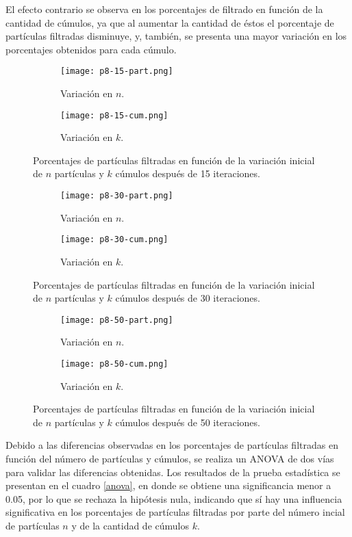 \documentclass{article}
\begin{document}
El efecto contrario se observa en los porcentajes de filtrado en función de la cantidad de cúmulos, ya que al aumentar la cantidad de éstos el porcentaje de partículas filtradas disminuye, y, también, se presenta una mayor variación en los porcentajes obtenidos para cada cúmulo.

\begin{figure}
\centering
\begin{subfigure}[b]{0.49\linewidth}
\texttt{[image: p8-15-part.png]}
\caption{Variación en $n$.}
\label{1}
\end{subfigure}
\begin{subfigure}[b]{0.49\linewidth}
\texttt{[image: p8-15-cum.png]}
\caption{Variación en $k$.}
\label{2}
\end{subfigure}
\caption{Porcentajes de partículas filtradas en función de la variación inicial de $n$ partículas y $k$ cúmulos después de 15 iteraciones.}
\label{15}
\end{figure}

\begin{figure}
\centering
\begin{subfigure}[b]{0.49\linewidth}
\texttt{[image: p8-30-part.png]}
\caption{Variación en $n$.}
\label{3}
\end{subfigure}
\begin{subfigure}[b]{0.49\linewidth}
\texttt{[image: p8-30-cum.png]}
\caption{Variación en $k$.}
\label{4}
\end{subfigure}
\caption{Porcentajes de partículas filtradas en función de la variación inicial de $n$ partículas y $k$ cúmulos después de 30 iteraciones.}
\label{30}
\end{figure}

\begin{figure}
\centering
\begin{subfigure}[b]{0.49\linewidth}
\texttt{[image: p8-50-part.png]}
\caption{Variación en $n$.}
\label{5}
\end{subfigure}
\begin{subfigure}[b]{0.49\linewidth}
\texttt{[image: p8-50-cum.png]}
\caption{Variación en $k$.}
\label{6}
\end{subfigure}
\caption{Porcentajes de partículas filtradas en función de la variación inicial de $n$ partículas y $k$ cúmulos después de 50 iteraciones.}
\label{50}
\end{figure}

Debido a las diferencias observadas en los porcentajes de partículas filtradas en función del número de partículas y cúmulos, se realiza un ANOVA de dos vías para validar las diferencias obtenidas. Los resultados de la prueba estadística se presentan en el cuadro \ref{anova}, en donde se obtiene una significancia menor a 0.05, por lo que se rechaza la hipótesis nula, indicando que sí hay una influencia significativa en los porcentajes de partículas filtradas por parte del número incial de partículas $n$ y de la cantidad de cúmulos $k$.   
\end{document}
